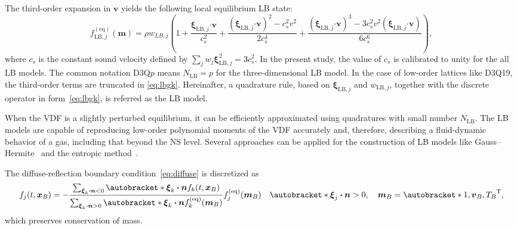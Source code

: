 \documentclass{elsarticle} %
\newcommand{\transpose}[1]{#1^\mathsf{T}}
\DeclarePairedDelimiter\autobracket()       %
\newcommand{\br}[1]{\autobracket*{#1}}
\newcommand{\bxi}{\boldsymbol{\xi}}
\newcommand{\bv}{\boldsymbol{v}}
\newcommand{\bn}{\boldsymbol{n}}
\newcommand{\bm}{\boldsymbol{m}}
\newcommand{\bdot}{\boldsymbol{\cdot}}
\newcommand{\bx}{\boldsymbol{x}}
\newcommand{\equil}[1]{#1^\mathrm{(eq)}}
\newcommand{\LB}{\mathrm{LB}}
\begin{document}
The third-order expansion in $\bv$ yields the following local equilibrium LB state:
\begin{equation}\label{eq:lbgk}
    \equil{f}_{\LB,j}(\bm) = \rho w_{LB,j}\left( 1
        + \frac{\bxi_{\LB,j}\bdot\bv}{c_s^2}
        + \frac{(\bxi_{\LB,j}\bdot\bv)^2-c_s^2v^2}{2c_s^4} + \frac{(\bxi_{\LB,j}\bdot\bv)^3-3c_s^2 v^2(\bxi_{\LB,j}\bdot\bv)}{6c_s^6}
    \right),
\end{equation}
where $c_s$ is the constant sound velocity defined by $\sum_jw_j\bxi^2_{\LB,j} = 3c_s^2$.
In the present study, the value of $c_s$ is calibrated to unity for the all LB models.
The common notation D3Q\(p\) means \(N_\LB=p\) for the three-dimensional LB model.
In the case of low-order lattices like D3Q19, the third-order terms are truncated in \eqref{eq:lbgk}.
Hereinafter, a quadrature rule, based on \(\bxi_{\LB,j}\) and \(w_{\LB,j}\),
together with the discrete operator in form~\eqref{eq:lbgk}, is referred as the LB model.

When the VDF is a slightly perturbed equilibrium,
it can be efficiently approximated using quadratures with small number \(N_\LB\).
The LB models are capable of reproducing low-order polynomial moments of the VDF accurately and,
therefore, describing a fluid-dynamic behavior of a gas, including that beyond the NS level.
Several approaches can be applied for the construction of LB models
like Gauss--Hermite~\cite{He1997, Shan1998, Shan2006, Shan2010}
and the entropic method~\cite{Karlin1999, Chikatamarla2006, Chikatamarla2009}.


The diffuse-reflection boundary condition~\eqref{eq:diffuse} is discretized as
\begin{equation}\label{eq:diffuse-dv}
    f_j(t,\bx_B) = -\frac{\sum_{\bxi_k\bdot\bn<0} \br{ \bxi_k\bdot\bn } f_k(t,\bx_B)}
        {\sum_{\bxi_k\bdot\bn>0} \br{ \bxi_k\bdot\bn } \equil{f}_k(\bm_B)}
        \equil{f}_j(\bm_B) \quad \br{ \bxi_j\bdot\bn>0 }, \quad \bm_B = \transpose{\br{1, \bv_B, T_B}},
\end{equation}
which preserves conservation of mass.
\end{document}
